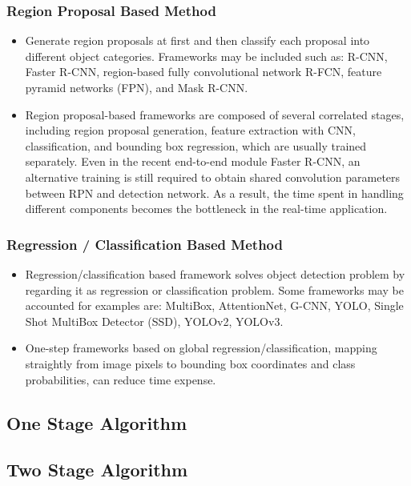         \subsubsection{Region Proposal Based Method}
            \begin{itemize}
                \item Generate region proposals at first and then classify each proposal into different object categories. Frameworks may be included such as: R-CNN, Faster R-CNN, region-based fully convolutional network R-FCN, feature pyramid networks (FPN), and Mask R-CNN.
                \item Region proposal-based frameworks are composed of several correlated stages, including region proposal generation, feature extraction with CNN, classification, and bounding box regression, which are usually trained separately. Even in the recent end-to-end module Faster R-CNN, an alternative training is still required to obtain shared convolution parameters between RPN and detection network. As a result, the time spent in handling different components becomes the bottleneck in the real-time application.
            \end{itemize}

        \subsubsection{Regression / Classification Based Method}
            \begin{itemize}
                \item Regression/classification based framework solves object detection problem by regarding it as regression or classification problem. Some frameworks may be accounted for examples are: MultiBox, AttentionNet, G-CNN, YOLO, Single Shot MultiBox Detector (SSD), YOLOv2, YOLOv3.
                \item One-step frameworks based on global regression/classification, mapping straightly from image pixels to bounding box coordinates and class probabilities, can reduce time expense.
            \end{itemize}

    \subsection{One Stage Algorithm}

    \subsection{Two Stage Algorithm}

